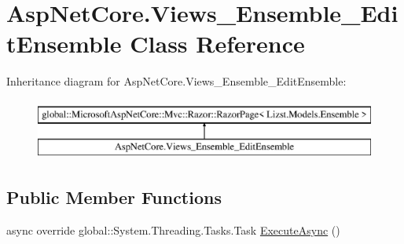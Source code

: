 \hypertarget{class_asp_net_core_1_1_views___ensemble___edit_ensemble}{}\section{Asp\+Net\+Core.\+Views\+\_\+\+Ensemble\+\_\+\+Edit\+Ensemble Class Reference}
\label{class_asp_net_core_1_1_views___ensemble___edit_ensemble}
Inheritance diagram for Asp\+Net\+Core.\+Views\+\_\+\+Ensemble\+\_\+\+Edit\+Ensemble\+:\begin{figure}[H]
\begin{center}
\leavevmode
\includegraphics[height=2.000000cm]{class_asp_net_core_1_1_views___ensemble___edit_ensemble}
\end{center}
\end{figure}
\subsection*{Public Member Functions}
\begin{DoxyCompactItemize}
\item 
async override global\+::\+System.\+Threading.\+Tasks.\+Task \mbox{\hyperlink{class_asp_net_core_1_1_views___ensemble___edit_ensemble_ae3ace6f7a83a5e6395bc9e8e2d18c70f}{Execute\+Async}} ()
\end{DoxyCompactItemize}
